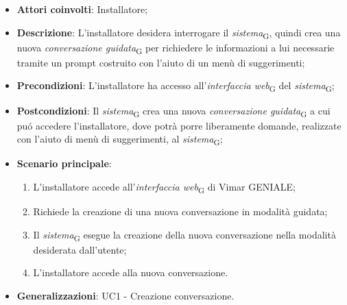 \begin{itemize}
    \item \textbf{Attori coinvolti}: Installatore;
    \item \textbf{Descrizione}: L’installatore desidera interrogare il \textit{sistema}\textsubscript{G}, quindi crea una nuova \textit{conversazione guidata}\textsubscript{G} per richiedere le informazioni a lui necessarie tramite un prompt costruito con l’aiuto di un menù di suggerimenti;
    \item \textbf{Precondizioni}: L’installatore ha accesso all’\textit{interfaccia web}\textsubscript{G} del \textit{sistema}\textsubscript{G};
    \item \textbf{Postcondizioni}: Il \textit{sistema}\textsubscript{G} crea una nuova \textit{conversazione guidata}\textsubscript{G} a cui puó accedere l’installatore, dove potrà porre liberamente domande, realizzate con l'aiuto di menù di suggerimenti, al \textit{sistema}\textsubscript{G};
    \item \textbf{Scenario principale}:
    \begin{enumerate}
        \item L’installatore accede all’\textit{interfaccia web}\textsubscript{G} di Vimar GENIALE;
        \item Richiede la creazione di una nuova conversazione in modalità guidata;
        \item Il \textit{sistema}\textsubscript{G} esegue la creazione della nuova conversazione nella modalità desiderata dall’utente;
        \item  L’installatore accede alla nuova conversazione.
    \end{enumerate}
    \item \textbf{Generalizzazioni}: UC1 - Creazione conversazione.
\end{itemize}

